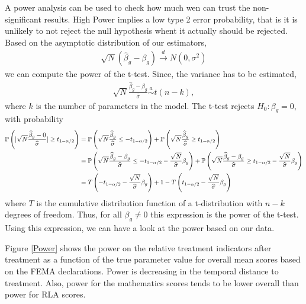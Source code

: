 A power analysis can be used to check how much wen can trust the non-significant results. High Power implies a low type 2 error probability, that is it is unlikely to not reject the null hypothesis whent it actually should be rejected. Based on the asymptotic distribution of our estimators,
\begin{align*}
	\sqrt{N} (\widehat{\beta}_{g} - \beta_{g}) \overset{d}{\to} N(0, \sigma^2)
\end{align*}
we can compute the power of the t-test. Since, the variance has to be estimated, 
\begin{align*}
	\sqrt{N} \frac{\widehat{\beta}_{g} - \beta_{g}}{\widehat{\sigma}} \overset{a}{\sim} t(n-k),
\end{align*}
where $k$ is the number of parameters in the model. The t-test rejects $H_0: \beta_g = 0$, with probability
\begin{align*}
	\mathbb{P} \left( \lvert \sqrt{N} \frac{\widehat{\beta}_{g} - 0}{\widehat{\sigma}} \rvert \geq t_{1-\alpha/2}  \right) &= \mathbb{P} \left(  \sqrt{N} \frac{\widehat{\beta}_{g}}{\widehat{\sigma}}  \leq -t_{1-\alpha/2}  \right) + \mathbb{P} \left( \sqrt{N} \frac{\widehat{\beta}_{g}}{\widehat{\sigma}} \geq t_{1-\alpha/2}  \right) \\
	&= \mathbb{P} \left(  \sqrt{N} \frac{\widehat{\beta}_{g} - \beta_g}{\widehat{\sigma}}  \leq -t_{1-\alpha/2} - \frac{\sqrt{N}}{\widehat{\sigma}} \beta_{g}  \right) + \mathbb{P} \left( \sqrt{N} \frac{\widehat{\beta}_{g} - \beta_g}{\widehat{\sigma}} \geq t_{1-\alpha/2}  - \frac{\sqrt{N}}{\widehat{\sigma}} \beta_{g} \right) \\
	&= T\left( -t_{1-\alpha/2} - \frac{\sqrt{N}}{\widehat{\sigma}} \beta_{g} \right) + 1 - T \left(  t_{1-\alpha/2}  - \frac{\sqrt{N}}{\widehat{\sigma}} \beta_{g} \right)
\end{align*}
where $T$ is the cumulative distribution function of a t-distribution with $n-k$ degrees of freedom. Thus, for all $\beta_g \neq 0$ this expression is the power of the t-test. Using this expression, we can have a look at the power based on our data.

Figure \ref{Power} shows the power on the relative treatment indicators after treatment as a function of the true parameter value for overall mean scores based on the FEMA declarations. Power is decreasing in the temporal distance to treatment. Also, power for the mathematics scores tends to be lower overall than power for RLA scores. 

